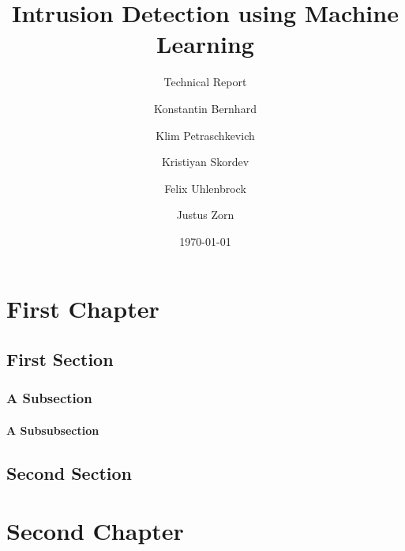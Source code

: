 \documentclass[oneside, english]{reports/assets/sdqtechreport}
\author{Konstantin Bernhard \and Klim Petraschkevich \and Kristiyan Skordev \and Felix Uhlenbrock \and Justus Zorn}
\title{Intrusion Detection using Machine Learning}
\subtitle{Technical Report}
\date{\today}
\begin{document}

\maketitle

\tableofcontents

\cleardoublepage


\chapter{First Chapter}
\label{chap:FirstContent}

\section{First Section}
\label{sec:FirstContent:FirstSection}

\Blindtext

\subsection{A Subsection}
\label{sec:FirstContent:FirstSubSection}

\Blindtext

\subsubsection{A Subsubsection}

\Blindtext[1]

\section{Second Section}
\label{sec:FirstContent:SecondSection}

\Blindtext

\chapter{Second Chapter}
\label{chap:SecondContent}
\end{document}
